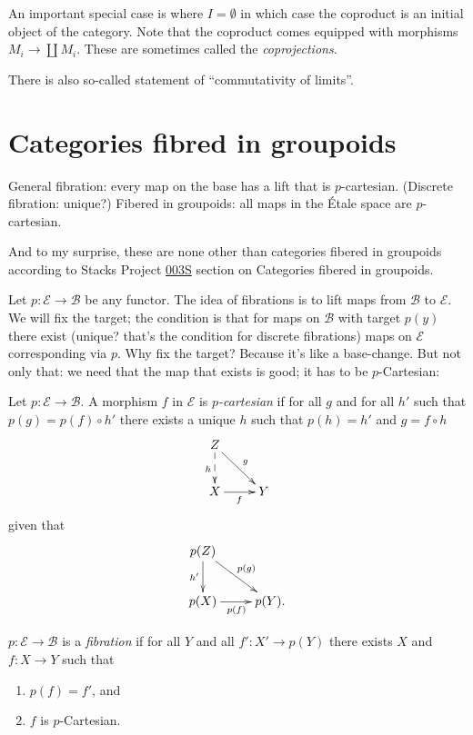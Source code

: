 \noindent
An important special case is where $I =
\emptyset$ in which case the
coproduct is an initial object of the
category.
Note that the coproduct comes equipped with
morphisms
$M_i \to \coprod M_i$. These are sometimes
called the
{\it coprojections}.

\medskip\noindent
There is also so-called statement
of ``commutativity of limits''.

\section{Categories fibred in groupoids}
\label{section-fibred-groupoids}

\noindent
General fibration: every map on the base has
a lift that is $p$-cartesian.
(Discrete fibration: unique?)
Fibered in groupoids: all maps in the Étale
space are $p$-cartesian.

\medskip\noindent
And to my surprise, these are none other than
categories fibered in groupoids according to
Stacks Project
\href{https://stacks.math.columbia.edu/tag/%
003S}{003S}
section
on Categories fibered in groupoids.

\medskip\noindent
Let $p:\mathcal{E} \to \mathcal{B}$ be any
functor.
The idea of fibrations is to lift maps from
$\mathcal{B}$ to $\mathcal{E}$.
We will fix the target; the condition is that
for maps on $\mathcal{B}$
with target $p(y)$ there exist
(unique? that's the condition for discrete
fibrations)
maps on $\mathcal{E}$ corresponding via $p$.
Why fix the target? Because it's like a
base-change.
But not only that: we need that the map that
exists
is good; it has to be $p$-Cartesian:

\begin{definition}
\label{definition-p-cartesian}
Let $p:\mathcal{E} \to \mathcal{B}$. A
morphism $f$ in  $\mathcal{E}$
is {\it $p$-cartesian} if for all $g$ and for
all $h'$
such that $p(g)=p(f) \circ h'$
there exists a unique $h$ such that
 $p(h)=h'$ and $g=f \circ h$
$$
\xymatrix{
Z \ar@{-->}[d]_h \ar[rd]^g\\
X \ar[r]_f& Y
}
$$
given that
$$
\xymatrix{
p(Z)\ar[d]_{h'}\ar[rd]^{p(g)}\\
p(X)\ar[r]_{p(f)}&p(Y).
}
$$
\end{definition}

\begin{definition}
\label{definition-fibration}
$p:\mathcal{E} \to \mathcal{B}$ is a {\it
fibration} if
for all $Y$ and all $f':X' \to p(Y)$ there
exists $X$ and
$f:X \to Y$ such that
\begin{enumerate}
\item $p(f)=f'$, and
\label{item-fibration1}

 \item $f$ is $p$-Cartesian.
\label{item-fibration2}
\end{enumerate}
\end{definition}

